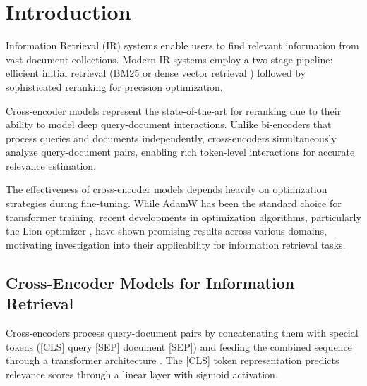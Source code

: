 
\chapter{Introduction} %

\label{Chapter1} %


\newcommand{\keyword}[1]{\textbf{#1}}
\newcommand{\tabhead}[1]{\textbf{#1}}
\newcommand{\code}[1]{\texttt{#1}}
\newcommand{\file}[1]{\texttt{\bfseries#1}}
\newcommand{\option}[1]{\texttt{\itshape#1}}



Information Retrieval (IR) systems enable users to find relevant information from vast document collections. Modern IR systems employ a two-stage pipeline: efficient initial retrieval (BM25 \cite{robertson2009probabilistic} or dense vector retrieval \cite{karpukhin2020dense}) followed by sophisticated reranking for precision optimization.

Cross-encoder models represent the state-of-the-art for reranking \cite{nogueira2020passagererankingbert,Nogueira2020Document} due to their ability to model deep query-document interactions. Unlike bi-encoders that process queries and documents independently, cross-encoders simultaneously analyze query-document pairs, enabling rich token-level interactions for accurate relevance estimation.

The effectiveness of cross-encoder models depends heavily on optimization strategies during fine-tuning. While AdamW \cite{loshchilov2019decoupled} has been the standard choice for transformer training, recent developments in optimization algorithms, particularly the Lion optimizer \cite{chen2023symbolic}, have shown promising results across various domains, motivating investigation into their applicability for information retrieval tasks.


\section{Cross-Encoder Models for Information Retrieval}

Cross-encoders process query-document pairs by concatenating them with special tokens ([CLS] query [SEP] document [SEP]) and feeding the combined sequence through a transformer architecture \cite{devlin2019bert}. The [CLS] token representation predicts relevance scores through a linear layer with sigmoid activation.

